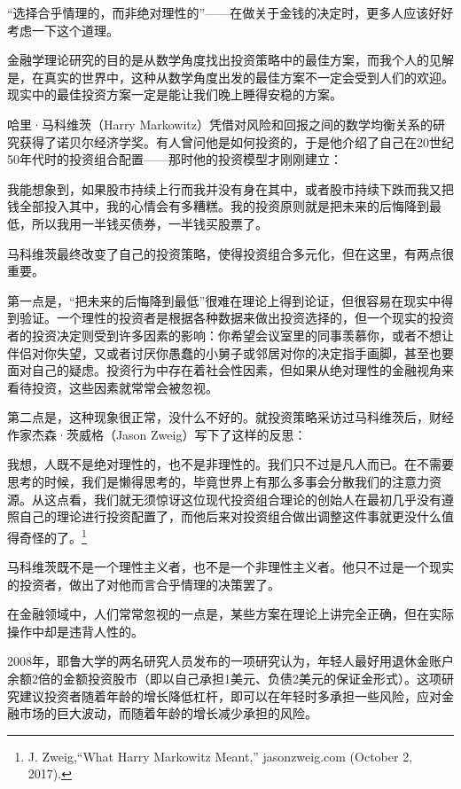 “选择合乎情理的，而非绝对理性的”——在做关于金钱的决定时，更多人应该好好考虑一下这个道理。

金融学理论研究的目的是从数学角度找出投资策略中的最佳方案，而我个人的见解是，在真实的世界中，这种从数学角度出发的最佳方案不一定会受到人们的欢迎。现实中的最佳投资方案一定是能让我们晚上睡得安稳的方案。

哈里·马科维茨（Harry Markowitz）凭借对风险和回报之间的数学均衡关系的研究获得了诺贝尔经济学奖。有人曾问他是如何投资的，于是他介绍了自己在20世纪50年代时的投资组合配置——那时他的投资模型才刚刚建立：

{\kaishu

我能想象到，如果股市持续上行而我并没有身在其中，或者股市持续下跌而我又把钱全部投入其中，我的心情会有多糟糕。我的投资原则就是把未来的后悔降到最低，所以我用一半钱买债券，一半钱买股票了。

}

马科维茨最终改变了自己的投资策略，使得投资组合多元化，但在这里，有两点很重要。

第一点是，“把未来的后悔降到最低”很难在理论上得到论证，但很容易在现实中得到验证。一个理性的投资者是根据各种数据来做出投资选择的，但一个现实的投资者的投资决定则受到许多因素的影响：你希望会议室里的同事羡慕你，或者不想让伴侣对你失望，又或者讨厌你愚蠢的小舅子或邻居对你的决定指手画脚，甚至也要面对自己的疑虑。投资行为中存在着社会性因素，但如果从绝对理性的金融视角来看待投资，这些因素就常常会被忽视。

第二点是，这种现象很正常，没什么不好的。就投资策略采访过马科维茨后，财经作家杰森·茨威格（Jason Zweig）写下了这样的反思：

{\kaishu

我想，人既不是绝对理性的，也不是非理性的。我们只不过是凡人而已。在不需要思考的时候，我们是懒得思考的，毕竟世界上有那么多事会分散我们的注意力资源。从这点看，我们就无须惊讶这位现代投资组合理论的创始人在最初几乎没有遵照自己的理论进行投资配置了，而他后来对投资组合做出调整这件事就更没什么值得奇怪的了。\footnote{J. Zweig,“What Harry Markowitz Meant,” jasonzweig.com (October 2, 2017).}

}

马科维茨既不是一个理性主义者，也不是一个非理性主义者。他只不过是一个现实的投资者，做出了对他而言合乎情理的决策罢了。

在金融领域中，人们常常忽视的一点是，某些方案在理论上讲完全正确，但在实际操作中却是违背人性的。

2008年，耶鲁大学的两名研究人员发布的一项研究认为，年轻人最好用退休金账户余额2倍的金额投资股市（即以自己承担1美元、负债2美元的保证金形式）。这项研究建议投资者随着年龄的增长降低杠杆，即可以在年轻时多承担一些风险，应对金融市场的巨大波动，而随着年龄的增长减少承担的风险。


